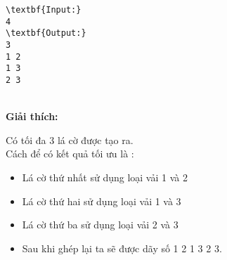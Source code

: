 \begin{verbatim}
\textbf{Input:}
4
\textbf{Output:}
3
1 2
1 3
2 3\end{verbatim}


\\\textbf{Giải thích:}

Có tối đa 3 lá cờ được tạo ra.
\\Cách để có kết quả tối ưu là :
\begin{itemize}
	\item Lá cờ thứ nhất sử dụng loại vải 1 và 2
	\item Lá cờ thứ hai sử dụng loại vải 1 và 3
	\item Lá cờ thứ ba sử dụng loại vải 2 và 3
	\item Sau khi ghép lại ta sẽ được dãy số 1 2 1 3 2 3.
\end{itemize}